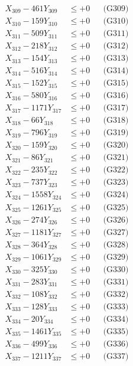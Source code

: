 \documentclass[a4paper,10pt]{article}
\begin{document}
{\begin{align}
X_{309} - 461Y_{309} &\leq +0 && \text{(G309)} \\
X_{310} - 159Y_{310} &\leq +0 && \text{(G310)} \\
\allowbreak
X_{311} - 509Y_{311} &\leq +0 && \text{(G311)} \\
X_{312} - 218Y_{312} &\leq +0 && \text{(G312)} \\
X_{313} - 154Y_{313} &\leq +0 && \text{(G313)} \\
X_{314} - 516Y_{314} &\leq +0 && \text{(G314)} \\
X_{315} - 152Y_{315} &\leq +0 && \text{(G315)} \\
X_{316} - 580Y_{316} &\leq +0 && \text{(G316)} \\
X_{317} - 1171Y_{317} &\leq +0 && \text{(G317)} \\
X_{318} - 66Y_{318} &\leq +0 && \text{(G318)} \\
X_{319} - 796Y_{319} &\leq +0 && \text{(G319)} \\
X_{320} - 159Y_{320} &\leq +0 && \text{(G320)} \\
\allowbreak
X_{321} - 86Y_{321} &\leq +0 && \text{(G321)} \\
X_{322} - 235Y_{322} &\leq +0 && \text{(G322)} \\
X_{323} - 737Y_{323} &\leq +0 && \text{(G323)} \\
X_{324} - 1558Y_{324} &\leq +0 && \text{(G324)} \\
X_{325} - 1261Y_{325} &\leq +0 && \text{(G325)} \\
X_{326} - 274Y_{326} &\leq +0 && \text{(G326)} \\
X_{327} - 1181Y_{327} &\leq +0 && \text{(G327)} \\
X_{328} - 364Y_{328} &\leq +0 && \text{(G328)} \\
X_{329} - 1061Y_{329} &\leq +0 && \text{(G329)} \\
X_{330} - 325Y_{330} &\leq +0 && \text{(G330)} \\
\allowbreak
X_{331} - 283Y_{331} &\leq +0 && \text{(G331)} \\
X_{332} - 108Y_{332} &\leq +0 && \text{(G332)} \\
X_{333} - 128Y_{333} &\leq +0 && \text{(G333)} \\
X_{334} - 20Y_{334} &\leq +0 && \text{(G334)} \\
X_{335} - 1461Y_{335} &\leq +0 && \text{(G335)} \\
X_{336} - 499Y_{336} &\leq +0 && \text{(G336)} \\
X_{337} - 1211Y_{337} &\leq +0 && \text{(G337)} \\

\end{align}}
\end{document}
